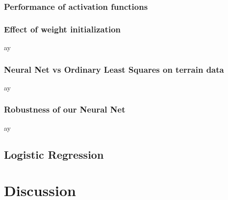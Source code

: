 \documentclass
[twocolumn,
secnumarabic,
nobibnotes,
aps,
prl,
reprint,
groupedaddress,
amsmath,
amssymb
]{revtex4-2}
\begin{document}
\subsubsection{Performance of activation functions}

\begin{center}
\end{center}

\begin{center}
\end{center}

\begin{center}
\end{center}

\subsubsection{Effect of weight initialization}
ay
\subsubsection{Neural Net vs Ordinary Least Squares on terrain data}
ay
\subsubsection{Robustness of our Neural Net}
ay

\subsection{Logistic Regression}


\section{Discussion}
\end{document}
